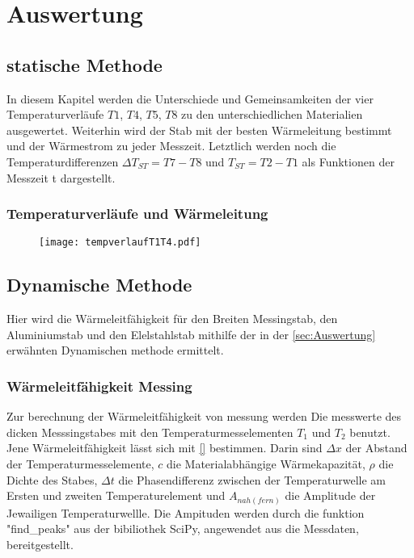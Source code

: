 \section{Auswertung}
\label{sec:Auswertung}

\subsection{statische Methode}
In diesem Kapitel werden die Unterschiede und Gemeinsamkeiten der vier 
Temperaturverläufe $T1$, $T4$, $T5$, $T8$ zu den unterschiedlichen Materialien 
ausgewertet. Weiterhin wird der Stab mit der besten Wärmeleitung bestimmt und 
der Wärmestrom zu jeder Messzeit. Letztlich werden noch die Temperaturdifferenzen 
$\Delta T_{ST}=T7-T8$ und $T_{ST}=T2-T1$ als Funktionen der Messzeit t dargestellt.

\subsubsection{Temperaturverläufe und Wärmeleitung}
\begin{figure}
    \centering
    \texttt{[image: tempverlaufT1T4.pdf]}

\end{figure}

\subsection{Dynamische Methode}
Hier wird die Wärmeleitfähigkeit für den Breiten Messingstab, den Aluminiumstab und den Elelstahlstab
mithilfe der in der \autoref{sec:Auswertung} erwähnten Dynamischen methode ermittelt.

\subsubsection{Wärmeleitfähigkeit Messing}
Zur berechnung der Wärmeleitfähigkeit von messung werden Die messwerte des dicken Messsingstabes
mit den Temperaturmesselementen $T_1$ und $T_2$ benutzt. Jene Wärmeleitfähigkeit lässt sich mit
\autoref{} bestimmen. Darin sind $\Delta x$ der Abstand der Temperaturmesselemente, $c$ die Materialabhängige
Wärmekapazität, $\rho $ die Dichte des Stabes, $\Delta t$ die Phasendifferenz
zwischen der Temperaturwelle am Ersten und zweiten Temperaturelement und $A_{nah(fern)}$ 
die Amplitude der Jewailigen Temperaturwellle. Die Ampituden werden durch die 
funktion "find_peaks" aus der bibiliothek SciPy, angewendet aus die Messdaten, bereitgestellt. 

